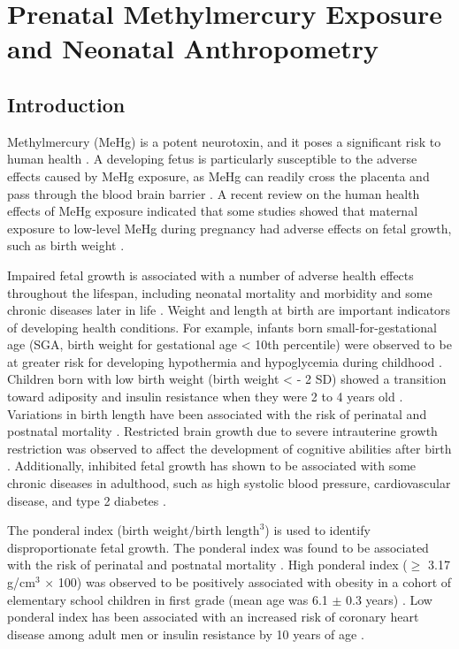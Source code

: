 \chapter{Prenatal Methylmercury Exposure and Neonatal Anthropometry}

\section{Introduction}

Methylmercury (MeHg) is a potent neurotoxin, and it poses a significant risk to human health \citep{mergler2007methylmercury,national2000toxicological}. A developing fetus is particularly susceptible to the adverse effects caused by MeHg exposure, as MeHg can readily cross the placenta and pass through the blood brain barrier \citep{clarkson2006toxicology}. A recent review on the human health effects of MeHg exposure indicated that some studies showed that maternal exposure to low-level MeHg during pregnancy had adverse effects on fetal growth, such as birth weight \citep{karagas2012evidence}.

Impaired fetal growth is associated with a number of adverse health effects throughout the lifespan, including neonatal mortality and morbidity \citep{bernstein2000morbidity} and some chronic diseases later in life \citep{barker2006adult,kajantie2005size}. Weight and length at birth are important indicators of developing health conditions. For example, infants born small-for-gestational age (SGA, birth weight for gestational age < 10th percentile) were observed to be at greater risk for developing hypothermia and hypoglycemia during childhood \citep{doctor2001perinatal}. Children born with low birth weight (birth weight < - 2 SD) showed a transition toward adiposity and insulin resistance when they were 2 to 4 years old \citep{ibanez2006early}. Variations in birth length have been associated with the risk of perinatal and postnatal mortality \citep{melve2000infants,cheung2002size}. Restricted brain growth due to severe intrauterine growth restriction was observed to affect the development of cognitive abilities after birth \citep{frisk2002importance}. Additionally, inhibited fetal growth has shown to be associated with some chronic diseases in adulthood, such as high systolic blood pressure,
cardiovascular disease, and type 2 diabetes \citep{barker2006adult}.

The ponderal index (\(\text{birth weight} / \text{birth length}^{3}\)) is used to identify disproportionate fetal growth. The ponderal index was found to be associated with the risk of perinatal and postnatal mortality \citep{cheung2002size}. High ponderal index (${\ge}$ 3.17 g/cm$^{3}$ ${\times}$ 100) was observed to be positively associated with obesity in a cohort of elementary school children in first grade (mean age was 6.1 \({\pm}\) 0.3 years) \citep{loaiza2011birth}. Low ponderal index has been associated with an increased risk of coronary heart disease among adult men \citep{eriksson2001size} or insulin resistance by 10 years of age \citep{larnkjaer2011thin}.

